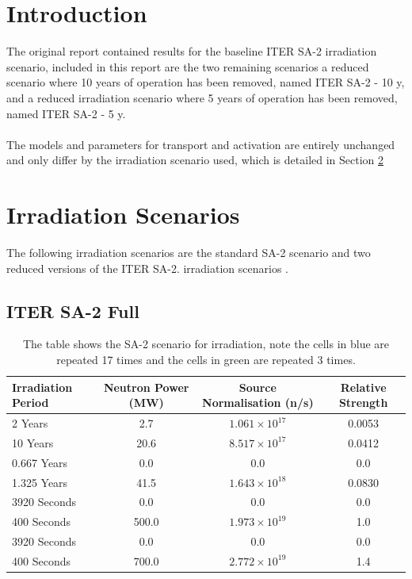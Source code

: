 \documentclass[12pt]{article}
\renewcommand{\listoffigures}{\begingroup
\tocsection
\tocfile{\listfigurename}{lof}
\endgroup}
\renewcommand{\listoftables}{\begingroup
\tocsection
\tocfile{\listtablename}{lot}
\endgroup}
\begin{document}
\maketitle
\newpage
\tableofcontents
\newpage
\listoffigures
\newpage
\listoftables
\newpage
\section{Introduction}
The original report \cite{iter_sdr_report} contained results for the baseline
ITER SA-2 irradiation scenario, included in this report are the two remaining
scenarios a reduced scenario where 10 years of operation has been removed, named
ITER SA-2 - 10 y,  and a reduced irradiation scenario where 5 years of operation
has been removed, named ITER SA-2 - 5 y.
\\
\\
The models and parameters for transport and activation are entirely unchanged 
and only differ by the irradiation scenario used, which is detailed in Section
\ref{sec:irradiation_scenario}
\newpage
\section{Irradiation Scenarios}
\label{sec:irradiation_scenario}
The following irradiation scenarios are the standard SA-2 scenario and 
two reduced versions of the ITER SA-2.
irradiation scenarios \cite{sa2_irradiation}. 
\subsection{ITER SA-2 Full}
\begin{table}[ht!]
   \begin{tabular}{| l | c | c | c |}
      \hline 
      Irradiation Period & Neutron Power (MW) & Source Normalisation (n/s) &  Relative Strength \\
      \hline
      2 Years & 2.7 & $1.061\times10^{17}$ & 0.0053 \\
      10 Years & 20.6 & $8.517\times10^{17}$ & 0.0412 \\
      0.667 Years & 0.0 & 0.0 & 0.0 \\
      1.325 Years & 41.5 & $1.643\times10^{18}$ & 0.0830 \\
      \cellcolor{blue!25} 3920 Seconds & \cellcolor{blue!25} 0.0 & \cellcolor{blue!25} 0.0 & \cellcolor{blue!25} 0.0 \\
      \cellcolor{blue!25} \cellcolor{blue!25} 400 Seconds & \cellcolor{blue!25} 500.0 & \cellcolor{blue!25} $1.973\times10^{19}$ & \cellcolor{blue!25} 1.0  \\
      \cellcolor{green!25} 3920 Seconds & \cellcolor{green!25} 0.0 & \cellcolor{green!25} 0.0 &\cellcolor{green!25} 0.0 \\
      \cellcolor{green!25} 400 Seconds & \cellcolor{green!25} 700.0 & \cellcolor{green!25} $2.772\times10^{19}$ &\cellcolor{green!25} 1.4 \\
      \hline
\end{tabular}
\caption{The table shows the SA-2 scenario for irradiation, note the
         cells in \textcolor{blue!25}{blue} are repeated 17 times
         and the cells in \textcolor{green!25}{green} are repeated 3
         times.}
\label{tab:irrad_scenario}
\end{table}
\end{document}
